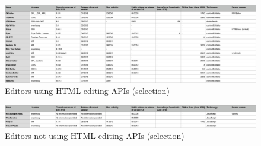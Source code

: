 \begin{table}[]
\centering
{}
\caption{Type instance API: options command}
\label{table:instance_api_options_command}
\end{table}




\clearpage
\newpage

\begin{landscape}

  \begin{figure}[htb]
    \centerline{\includegraphics[width=\linewidth]{images/table-ce-editors.png}}
    \caption{Editors using HTML editing APIs (selection)}
    \label{fig:editors_editing_apis_table}
  \end{figure}
  
  \begin{figure}[htb]
    \centerline{\includegraphics[width=\linewidth]{images/table-js-editors.png}}
    \caption{Editors not using HTML editing APIs (selection)}
    \label{fig:editors_not_editing_apis_table}
  \end{figure}
  
\end{landscape}


